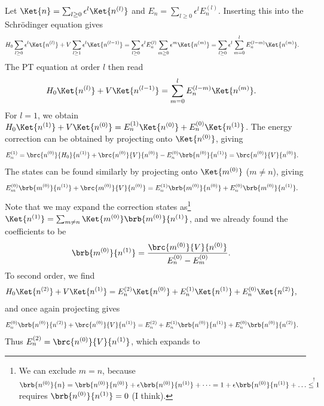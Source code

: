 \documentclass[english, parskip=full]{scrartcl}
\begin{document}
Let $\Ket{n} = \sum_{l\ge 0} \epsilon^l \Ket{n^{(l)}}$ and $E_n = \sum_{l\ge 0} \epsilon^l E_n^{(l)}$.
Inserting this into the Schrödinger equation gives
\begin{align}
H_0\sum_{l\ge 0} \epsilon^l \Ket{n^{(l)}} + V \sum_{l\ge 1} \epsilon^{l} \Ket{n^{(l-1)}} &=  \sum_{l\ge 0} \epsilon^l E_n^{(l)} \sum_{m\ge 0} \epsilon^m \Ket{n^{(m)}} = \sum_{l\ge 0} \epsilon^l \sum_{m=0}^l E_n^{(l-m)} \Ket{n^{(m)}}.
\end{align}
The PT equation at order $l$ then read
\begin{align}
H_0\Ket{n^{(l)}} + V\Ket{n^{(l-1)}} &= \sum_{m=0}^l E_n^{(l-m)} \Ket{n^{(m)}}.
\end{align}
For $l=1$, we obtain $H_0 \Ket{n^{(1)}} + V\Ket{n^{(0)}} = E_n^{(1)} \Ket{n^{(0)}} + E_n^{(0)} \Ket{n^{(1)}}$.
The energy correction can be obtained by projecting onto $\Ket{n^{(0)}}$, giving
\begin{align}
E_n^{(1)} &= \brc{n^{(0)}}{H_0}{n^{(1)}} + \brc{n^{(0)}}{V}{n^{(0)}} - E_n^{(0)} \brb{n^{(0)}}{n^{(1)}} = \brc{n^{(0)}}{V}{n^{(0)}}.
\end{align}
The states can be found similarly by projecting onto $\Ket{m^{(0)}}$ ($m\neq n$), giving
\begin{align}
E_m^{(0)} \brb{m^{(0)}}{n^{(1)}} + \brc{m^{(0)}}{V}{n^{(0)}} &= E_n^{(1)} \brb{m^{(0)}}{n^{(0)}} + E_n^{(0)} \brb{m^{(0)}}{n^{(1)}}.
\end{align}
Note that we may expand the correction states as\footnote{We can exclude $m=n$, because $\brb{n^{(0)}}{n} = \brb{n^{(0)}}{n^{(0)}} + \epsilon \brb{n^{(0)}}{n^{(1)}} + \dots = 1 + \epsilon \brb{n^{(0)}}{n^{(1)}} + \dots \overset{!}{\le 1}$ requires $\brb{n^{(0)}}{n^{(1)}} = 0$ (I think).} $\Ket{n^{(1)}} = \sum_{m\neq n} \Ket{m^{(0)}} \brb{m^{(0)}}{n^{(1)}}$, and we already found the coefficients to be
\begin{align}
\brb{m^{(0)}}{n^{(1)}} &= \frac{\brc{m^{(0)}}{V}{n^{(0)}}}{E_n^{(0)} - E_m^{(0)}}.
\end{align}
To second order, we find
\begin{align}
H_0\Ket{n^{(2)}} + V\Ket{n^{(1)}} &= E_n^{(2)} \Ket{n^{(0)}} + E_n^{(1)} \Ket{n^{(1)}} + E_n^{(0)} \Ket{n^{(2)}},
\end{align}
and once again projecting gives
\begin{align}
E_n^{(0)} \brb{n^{(0)}}{n^{(2)}} + \brc{n^{(0)}}{V}{n^{(1)}} &= E_n^{(2)} + E_n^{(1)} \brb{n^{(0)}}{n^{(1)}} + E_n^{(0)} \brb{n^{(0)}}{n^{(2)}}.
\end{align}
Thus $E_n^{(2)} = \brc{n^{(0)}}{V}{n^{(1)}}$, which expands to
\end{document}

